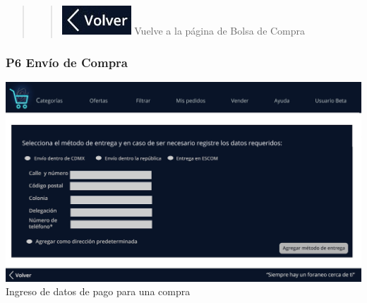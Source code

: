 \documentclass[14pt]{article}
\begin{document}
\begin{quote}
\begin{quote}
                            \includegraphics[height=0.02\textwidth]{BotonVolver.jpg}
                            \label{P5:BotonVolver} Vuelve a la página de Bolsa de Compra
                    \end{quote}
                \end{quote}
            
            \newpage
            \subsubsection{P6 Envío de Compra}\label{{P6 Envío de Compra}}
                \begin{center}
                    \includegraphics[height=0.55\textwidth]{Envio.jpg}
                    \label{fig:Envio} \\ [Figura 7] Ingreso de datos de pago para una compra
                \end{center}
\end{document}
